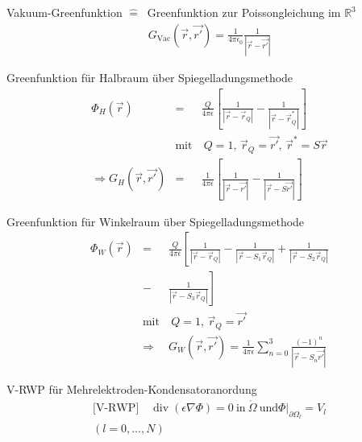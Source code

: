 \documentclass[a6paper]{kartei}
\begin{document}
\begin{karte}{Vakuum-Greenfunktion $\widehat{=} \ $ Greenfunktion zur Poissongleichung im $\mathbb{R}^{3}$}
\begin{eqnarray}
G_{\text{Vac}}(\vec{r},\vec{r'}) = \frac{1}{4 \pi \epsilon_{0}} \frac{1}{|\vec{r} - \vec{r'}|}
\end{eqnarray}
\end{karte}

\begin{karte}{Greenfunktion für Halbraum über Spiegelladungsmethode}
\begin{eqnarray}
 \Phi_{H}(\vec{r}) & = & \frac{Q}{4 \pi \epsilon} \left[ \frac{1}{|\vec{r} - \vec{r}_{Q}|} - \frac{1}{|\vec{r} - \vec{r}_{Q}^{*}|} \right]  \\
& \text{mit} & \ Q  =  1, \, \vec{r}_{Q} = \vec{r'}, \, \vec{r}^{*} = S \vec{r} \nonumber \\
\Rightarrow  G_{H}(\vec{r}, \vec{r'}) & = & \frac{1}{4 \pi \epsilon} \left[ \frac{1}{|\vec{r} - \vec{r'}|} - \frac{1}{|\vec{r} - S\vec{r'}|} \right]
\end{eqnarray}
\end{karte}

\begin{karte}{Greenfunktion für Winkelraum über Spiegelladungsmethode}
\begin{eqnarray}
 \Phi_{W}(\vec{r})   & = &  \frac{Q}{4 \pi \epsilon} \left[ \frac{1}{|\vec{r} - \vec{r}_{Q}|} - \frac{1}{|\vec{r} - S_{1}\vec{r}_{Q}|} +
\frac{1}{|\vec{r} - S_{2}\vec{r}_{Q}|} \right. \nonumber \\ & - & \left. \frac{1}{|\vec{r} - S_{3}\vec{r}_{Q}|}  \right]
\\
& \text{mit} & \ Q = 1, \, \vec{r}_{Q} = \vec{r'} \nonumber \\
& \Rightarrow &  G_{W}(\vec{r}, \vec{r'})  =  \frac{1}{4 \pi \epsilon} \sum \limits_{n = 0}^{3} \frac{(-1)^{n}}{|\vec{r} - S_{n}\vec{r'}|}
\end{eqnarray}
\end{karte}
\begin{karte}{V-RWP für Mehrelektroden-Kondensatoranordung}
 \begin{eqnarray}
 \text{[V-RWP]} \quad \operatorname{div}(\epsilon \nabla \Phi) = 0 \ \text{in} \ \mathring{\Omega}
   \ \text{und} \left. \Phi\right|_{\partial \Omega_{l}} = V_{l} \\
  (l = 0, \dots , N) \nonumber
\end{eqnarray}

\end{karte}
\end{document}
